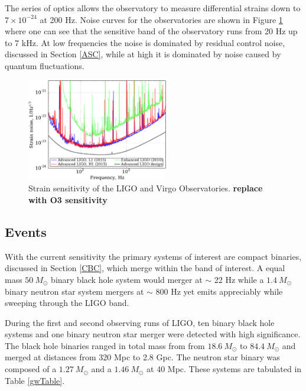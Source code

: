 \documentclass [12pt, proquest]{uwthesis}[2019]
\begin{document}
The series of optics allows the observatory to measure differential strains down to $7\times10^{-24}$ at 200 Hz.  Noise curves for the observatories are shown in Figure \ref{LIGO_Strain} where one can see that the sensitive band of the observatory runs from 20 Hz up to 7 kHz. At low frequencies the noise is dominated by residual control noise, discussed in Section \ref{ASC}, while at high it is dominated by noise caused by quantum fluctuations.  \cite{Squeeze}

\begin{figure}
\begin{center}
\includegraphics[width=0.55\textwidth]{StrainCurve.pdf}
\caption[Strain sensitivity of the LIGO and Virgo Observatories]{Strain sensitivity of the LIGO and Virgo Observatories. \textbf{replace with O3 sensitivity}}
\label{LIGO_Strain}
\end{center}
\end{figure}


\subsection{Events}

With the current sensitivity the primary systems of interest are compact binaries, discussed in Section \ref{CBC}, which merge within the band of interest. A equal mass $50\ M_\odot$ binary black hole system would merger at $\sim$ 22 Hz while a $1.4\ M_\odot$ binary neutron star system mergers at $\sim$ 800 Hz yet emits appreciably while sweeping through the LIGO band.

During the first and second observing runs of LIGO, ten binary black hole systems and one binary neutron star merger were detected with high significance. \cite{GWTC} The black hole binaries ranged in total mass from from $18.6\ M_\odot$ to $84.4\ M_\odot$ and merged at distances from 320 Mpc to 2.8 Gpc. The neutron star binary was composed of a $1.27\ M_\odot$ and a $1.46\ M_\odot$ at 40 Mpc. These systems are tabulated in Table \ref{gwTable}.
\end{document}
